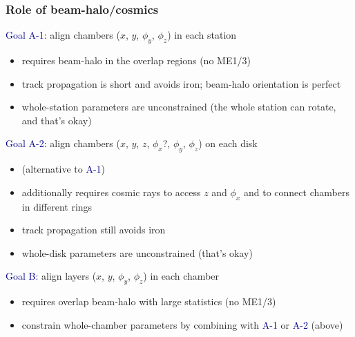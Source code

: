 \documentclass[compress]{beamer}
\begin{document}
\begin{frame}
\frametitle{Role of beam-halo/cosmics}
\textcolor{darkblue}{Goal A-1:} align chambers ($x$, $y$, $\phi_y$, $\phi_z$) in each station
\begin{itemize}
\item requires beam-halo in the overlap regions (no ME1/3)
\item track propagation is short and avoids iron; beam-halo orientation is perfect
\item whole-station parameters are unconstrained (the whole station
can rotate, and that's okay)
\end{itemize}

\vfill
\textcolor{darkblue}{Goal A-2:} align chambers ($x$, $y$, $z$, $\phi_x$?, $\phi_y$, $\phi_z$) on each disk
\begin{itemize}
\item (alternative to \textcolor{darkblue}{A-1})
\item additionally requires cosmic rays to access $z$ and $\phi_x$ and to connect
chambers in different rings
\item track propagation still avoids iron
\item whole-disk parameters are unconstrained (that's okay)
\end{itemize}

\vfill
\textcolor{darkblue}{Goal B:} align layers ($x$, $y$, $\phi_y$, $\phi_z$) in each chamber
\begin{itemize}
\item requires overlap beam-halo with large statistics (no ME1/3)
\item constrain whole-chamber parameters by combining with
\textcolor{darkblue}{A-1} or \textcolor{darkblue}{A-2} (above)
\end{itemize}
\end{frame}
\end{document}
